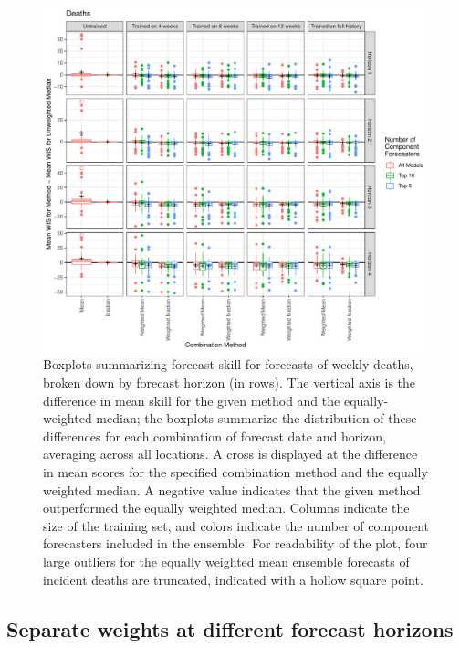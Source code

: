 \documentclass[review]{elsarticle}
\begin{document}
\begin{figure}
  \includegraphics[width=\textwidth]{figures/wis_boxplots_main_by_horizon_Deaths.pdf}
  \caption{Boxplots summarizing forecast skill for forecasts of weekly deaths, broken down by forecast horizon (in rows).
  The vertical axis is the difference in mean skill for the given method and the equally-weighted median;
  the boxplots summarize the distribution of these differences for each combination of forecast date and horizon, averaging across all locations.
  A cross is displayed at the difference in mean scores for the specified combination method and the equally weighted median.
  A negative value indicates that the given method outperformed the equally weighted median.
  Columns indicate the size of the training set, and colors indicate the number of component forecasters included in the ensemble.
  For readability of the plot, four large outliers for the equally weighted mean ensemble forecasts of incident deaths are truncated, indicated with a hollow square point.}
\end{figure}

\subsection{Separate weights at different forecast horizons}
\end{document}
